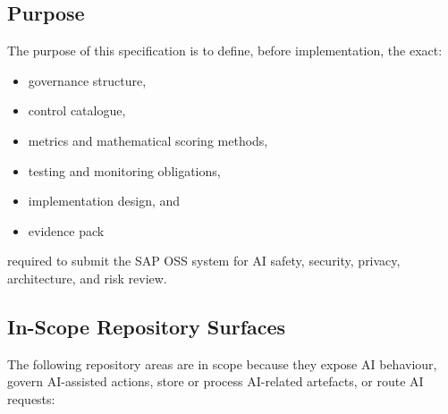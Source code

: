 \documentclass[11pt,a4paper]{article}
\begin{document}
\subsection{Purpose}

The purpose of this specification is to define, before implementation, the exact:

\begin{itemize}[nosep]
    \item governance structure,
    \item control catalogue,
    \item metrics and mathematical scoring methods,
    \item testing and monitoring obligations,
    \item implementation design, and
    \item evidence pack
\end{itemize}

required to submit the SAP OSS system for AI safety, security, privacy, architecture, and risk review.

\subsection{In-Scope Repository Surfaces}

The following repository areas are in scope because they expose AI behaviour, govern AI-assisted actions, store or process AI-related artefacts, or route AI requests:
\end{document}
